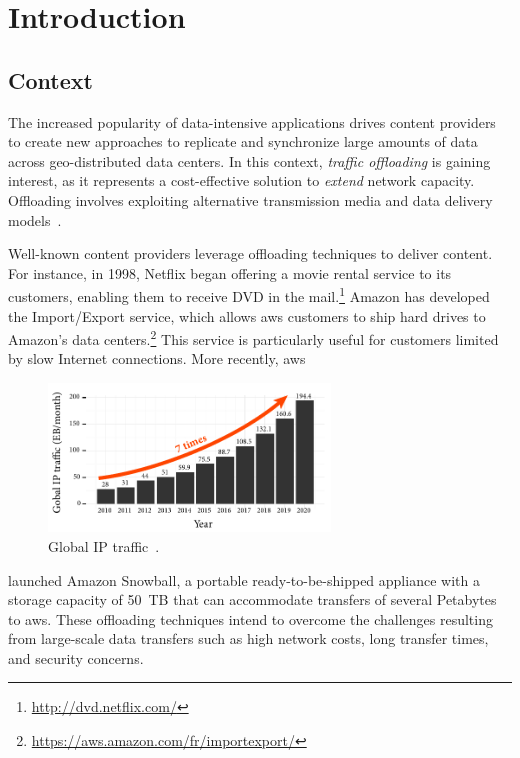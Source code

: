 \chapter{Introduction}
\label{cha:introduction}

\section{Context}

The increased popularity of data-intensive applications drives content providers to create new approaches to replicate and synchronize large amounts of data across geo-distributed data centers. In this context, \textit{traffic offloading} is gaining interest, as it represents a cost-effective solution to \textit{extend} network capacity. Offloading involves exploiting alternative transmission media and data delivery models~\cite{patterson2003conversation}.

Well-known content providers leverage offloading techniques to deliver content. For instance, in 1998, Netflix began offering a movie rental service to its customers, enabling them to receive DVD in the mail.\footnote{\url{http://dvd.netflix.com/}} Amazon has developed the Import/Export service, which allows \acrfull{aws} customers to ship hard drives to Amazon's data centers.\footnote{\url{https://aws.amazon.com/fr/importexport/}} This service is particularly useful for customers limited by slow Internet connections. More recently, \acrshort{aws}
\begin{figure}
    \vspace{-15pt}
    \centering
    \includegraphics[width=7.5cm]{figures/vni.pdf}
    \vspace{-5pt}
    \caption{Global IP traffic~\cite{index2014forecast}.}
    \label{fig:vni}
\end{figure}
launched Amazon Snowball, a portable ready-to-be-shipped appliance with a storage capacity of 50~TB that can accommodate transfers of several Petabytes to \acrshort{aws}. These offloading techniques intend to overcome the challenges resulting from large-scale data transfers such as high network costs, long transfer times, and security concerns.

